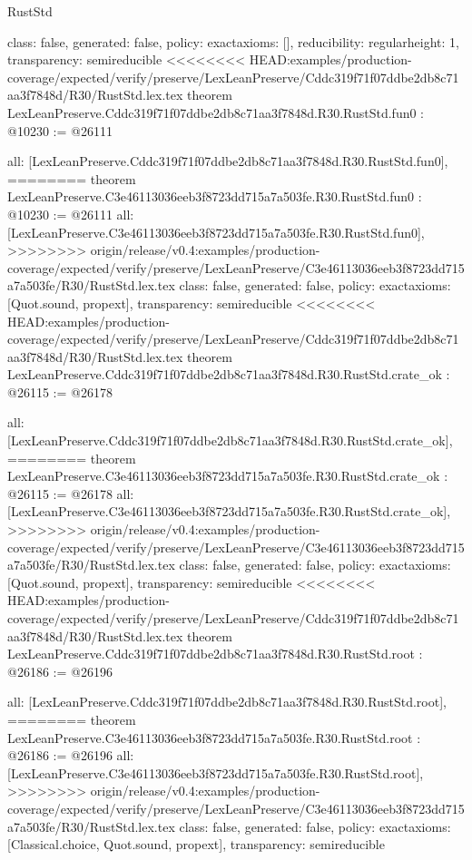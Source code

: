 \begin{lexlean}{RustStd}
\begin{coremodule}
{\begin{coremodule}
{{{  class: false,
  generated: false,
  policy: exact{axioms: []},
  reducibility: regular{height: 1},
  transparency: semireducible
}
<<<<<<<< HEAD:examples/production-coverage/expected/verify/preserve/LexLeanPreserve/Cddc319f71f07ddbe2db8c71aa3f7848d/R30/RustStd.lex.tex
theorem LexLeanPreserve.Cddc319f71f07ddbe2db8c71aa3f7848d.R30.RustStd.fun0 : @10230 := @26111 {
  all: [LexLeanPreserve.Cddc319f71f07ddbe2db8c71aa3f7848d.R30.RustStd.fun0],
========
theorem LexLeanPreserve.C3e46113036eeb3f8723dd715a7a503fe.R30.RustStd.fun0 : @10230 := @26111 {
  all: [LexLeanPreserve.C3e46113036eeb3f8723dd715a7a503fe.R30.RustStd.fun0],
>>>>>>>> origin/release/v0.4:examples/production-coverage/expected/verify/preserve/LexLeanPreserve/C3e46113036eeb3f8723dd715a7a503fe/R30/RustStd.lex.tex
  class: false,
  generated: false,
  policy: exact{axioms: [Quot.sound, propext]},
  transparency: semireducible
}
<<<<<<<< HEAD:examples/production-coverage/expected/verify/preserve/LexLeanPreserve/Cddc319f71f07ddbe2db8c71aa3f7848d/R30/RustStd.lex.tex
theorem LexLeanPreserve.Cddc319f71f07ddbe2db8c71aa3f7848d.R30.RustStd.crate_ok : @26115 := @26178 {
  all: [LexLeanPreserve.Cddc319f71f07ddbe2db8c71aa3f7848d.R30.RustStd.crate_ok],
========
theorem LexLeanPreserve.C3e46113036eeb3f8723dd715a7a503fe.R30.RustStd.crate_ok : @26115 := @26178 {
  all: [LexLeanPreserve.C3e46113036eeb3f8723dd715a7a503fe.R30.RustStd.crate_ok],
>>>>>>>> origin/release/v0.4:examples/production-coverage/expected/verify/preserve/LexLeanPreserve/C3e46113036eeb3f8723dd715a7a503fe/R30/RustStd.lex.tex
  class: false,
  generated: false,
  policy: exact{axioms: [Quot.sound, propext]},
  transparency: semireducible
}
<<<<<<<< HEAD:examples/production-coverage/expected/verify/preserve/LexLeanPreserve/Cddc319f71f07ddbe2db8c71aa3f7848d/R30/RustStd.lex.tex
theorem LexLeanPreserve.Cddc319f71f07ddbe2db8c71aa3f7848d.R30.RustStd.root : @26186 := @26196 {
  all: [LexLeanPreserve.Cddc319f71f07ddbe2db8c71aa3f7848d.R30.RustStd.root],
========
theorem LexLeanPreserve.C3e46113036eeb3f8723dd715a7a503fe.R30.RustStd.root : @26186 := @26196 {
  all: [LexLeanPreserve.C3e46113036eeb3f8723dd715a7a503fe.R30.RustStd.root],
>>>>>>>> origin/release/v0.4:examples/production-coverage/expected/verify/preserve/LexLeanPreserve/C3e46113036eeb3f8723dd715a7a503fe/R30/RustStd.lex.tex
  class: false,
  generated: false,
  policy: exact{axioms: [Classical.choice, Quot.sound, propext]},
  transparency: semireducible
}

}}}}}
\end{coremodule}}
\end{coremodule}
\end{lexlean}
